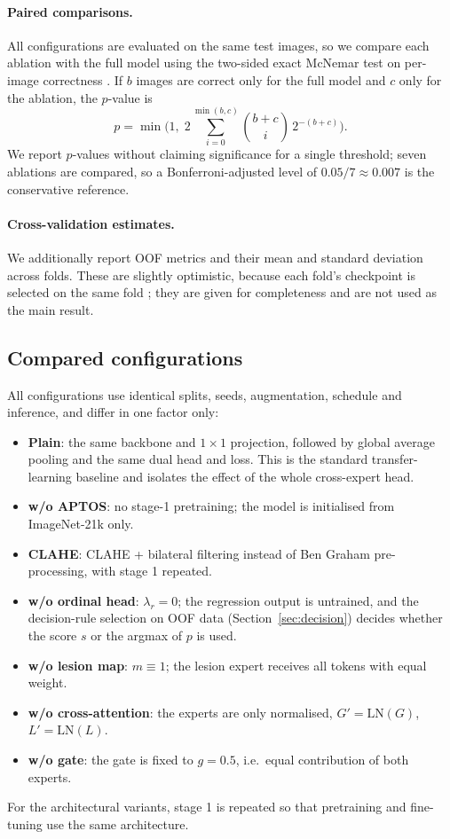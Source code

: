 \paragraph{Paired comparisons.} All configurations are evaluated on the same test images, so we compare each
ablation with the full model using the two-sided exact McNemar test on per-image correctness
\citep{dietterich1998approximate}. If $b$ images are correct only for the full model and $c$ only for the ablation,
the $p$-value is
\begin{equation}
p = \min\!\Big(1,\; 2\sum_{i=0}^{\min(b,c)} \binom{b+c}{i}\,2^{-(b+c)}\Big).
\end{equation}
We report $p$-values without claiming significance for a single threshold; seven ablations are compared, so a
Bonferroni-adjusted level of $0.05/7\approx0.007$ is the conservative reference.

\paragraph{Cross-validation estimates.} We additionally report OOF metrics and their mean and standard deviation across
folds. These are slightly optimistic, because each fold's checkpoint is selected on the same fold
\citep{varma2006bias}; they are given for completeness and are not used as the main result.

\subsection{Compared configurations}
All configurations use identical splits, seeds, augmentation, schedule and inference, and differ in one factor only:
\begin{itemize}
\item \textbf{Plain}: the same backbone and $1\times1$ projection, followed by global average pooling and the same
  dual head and loss. This is the standard transfer-learning baseline and isolates the effect of the whole
  cross-expert head.
\item \textbf{w/o APTOS}: no stage-1 pretraining; the model is initialised from ImageNet-21k only.
\item \textbf{CLAHE}: CLAHE + bilateral filtering instead of Ben Graham pre-processing, with stage 1 repeated.
\item \textbf{w/o ordinal head}: $\lambda_r=0$; the regression output is untrained, and the decision-rule selection on OOF
  data (Section~\ref{sec:decision}) decides whether the score $s$ or the argmax of $p$ is used.
\item \textbf{w/o lesion map}: $m\equiv1$; the lesion expert receives all tokens with equal weight.
\item \textbf{w/o cross-attention}: the experts are only normalised, $G'=\mathrm{LN}(G)$, $L'=\mathrm{LN}(L)$.
\item \textbf{w/o gate}: the gate is fixed to $g=0.5$, i.e.\ equal contribution of both experts.
\end{itemize}
For the architectural variants, stage 1 is repeated so that pretraining and fine-tuning use the same architecture.

